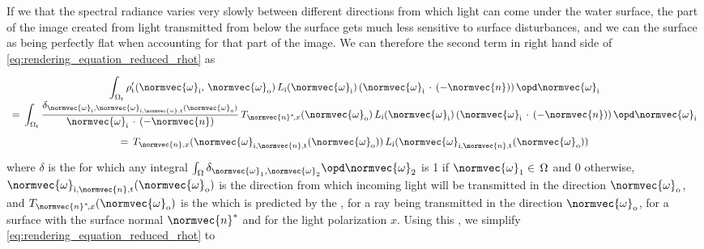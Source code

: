 If we \assume that the spectral radiance varies very slowly between different directions from which light can come under the water surface, the part of the image created from light transmitted from below the surface gets much less sensitive to surface disturbances, and we can \approximate the surface as being perfectly flat when accounting for that part of the image. We can therefore \approximate the second term in right hand side of \eqref{eq:rendering_equation_reduced_rhot} as
%
\begin{equation}
\renewcommand*{\arraystretch}{2}
\begin{array}{c}
\displaystyle \int_{\Omega_{\text{t}}} \rho'_{\text{t}}(\normvec{\omega}_{\text{i}},\, \normvec{\omega}_{\text{o}})\, L_{\text{i}}(\normvec{\omega}_{\text{i}})\, (\normvec{\omega}_{\text{i}}\,\cdot\,(-\normvec{n}))\, \opd \normvec{\omega}_{\text{i}} \\
\displaystyle =\, \int_{\Omega_{\text{t}}} \frac{\delta_{\normvec{\omega}_{\text{i}},\normvec{\omega}_{\text{i},\normvec{n},\text{t}}(\normvec{\omega}_{\text{o}})}}{\normvec{\omega}_{\text{i}}\,\cdot\,(-\normvec{n})}\,T_{\normvec{n}^*\!,x}(\normvec{\omega}_{\text{o}})\, L_{\text{i}}(\normvec{\omega}_{\text{i}})\, (\normvec{\omega}_{\text{i}}\,\cdot\,(-\normvec{n}))\, \opd \normvec{\omega}_{\text{i}} \\
\displaystyle =\, T_{\normvec{n},x}(\normvec{\omega}_{\text{i},\normvec{n},\text{t}}(\normvec{\omega}_{\text{o}}))\, L_{\text{i}}(\normvec{\omega}_{\text{i},\normvec{n},\text{t}}(\normvec{\omega}_{\text{o}}))
\end{array}
\end{equation}
%
where $\delta$ is the  for which any integral $\int_{\Omega}\delta_{\normvec{\omega}_1,\normvec{\omega}_2}\opd \normvec{\omega}_2$ is 1 if $\normvec{\omega}_1 \in\, \Omega$ and 0 otherwise, $\normvec{\omega}_{\text{i},\normvec{n},\text{t}}(\normvec{\omega}_{\text{o}})$ is the direction from which incoming light will be transmitted in the direction $\normvec{\omega}_{\text{o}}$, and $T_{\normvec{n}^*\!,x}(\normvec{\omega}_{\text{o}})$ is the  which is predicted by the , for a ray being transmitted in the direction $\normvec{\omega}_{\text{o}}$, for a surface with the surface normal $\normvec{n}^*$ and for the light polarization $x$. Using this \approximation, we simplify \eqref{eq:rendering_equation_reduced_rhot} to
%
